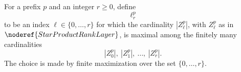 \begin{definition}
For a prefix \(p\) and an integer \(r\ge0\), define
\[
  \ell_r^p
\]
to be an index \(\ell\in\{0,\ldots,r\}\) for which the cardinality
\(|Z_\ell^p|\), with \(Z_\ell^p\) as in \(\noderef{StarProductRankLayer}\),
is maximal among the finitely many cardinalities
\[
  |Z_0^p|,\ |Z_1^p|,\ \ldots,\ |Z_r^p|.
\]
The choice is made by finite maximization over the set
\(\{0,\ldots,r\}\).
\end{definition}
